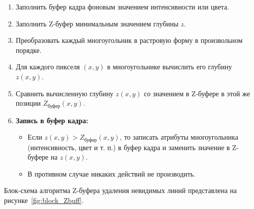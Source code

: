 \begin{enumerate}
    \item Заполнить буфер кадра фоновым значением интенсивности или цвета.
    
    \item Заполнить Z-буфер минимальным значением глубины \( z \).
    
    \item Преобразовать каждый многоугольник в растровую форму в произвольном порядке.
    
    \item Для каждого пикселя \( (x, y) \) в многоугольнике вычислить его глубину \( z(x, y) \).
    
    \item Сравнить вычисленную глубину \( z(x, y) \) со значением в Z-буфере в этой же позиции \( Z_{\text{буфер}}(x, y) \).
    
    \item \textbf{Запись в буфер кадра:}
    \begin{itemize}
        \item Если \( z(x, y) > Z_{\text{буфер}}(x, y) \), то записать атрибуты многоугольника (интенсивность, цвет и т. п.) в буфер кадра и заменить значение в Z-буфере на \( z(x, y) \).
        \item В противном случае никаких действий не производить.~\cite{roberts}
    \end{itemize}
\end{enumerate}

Блок-схема алгоритма Z-буфера удаления невидимых линий представлена на рисунке~\ref{fig:block_Zbuff}.


